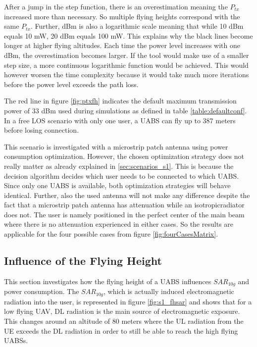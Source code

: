After a jump in the step function, there is an overestimation meaning the $P_{tx}$ increased more than necessary. So multiple flying heights correspond with the same $P_{tx}$.
Further, dBm is also a logarithmic scale meaning that while 10 dBm equals 10 mW, 20 dBm equals 100 mW. This explains why the black lines become longer at higher flying altitudes.
Each time the power level increases with one dBm, the overestimation becomes larger. If the tool would make use of a smaller step size, a more continuous 
logarithmic function would be achieved. This would however worsen the time complexity because it would take much more iterations before 
the power level exceeds the path loss. 

The red line in figure \ref{fig:ptxfh} indicates the default maximum transmission power of 33 dBm used during simulations as 
defined in table \ref{table:defaultconf}. 
In a free \gls{LOS} scenario with only one user, a \gls{UABS} can fly up to 387 meters before losing connection.

This scenario is investigated with a microstrip patch antenna using power consumption optimization. 
 However, the chosen optimization strategy does not really matter as already explained in  \ref{sec:scenarios_s1}. This is because the decision 
 algorithm decides which user 
needs to be connected to which \gls{UABS}. Since only one \gls{UABS} is available, both optimization strategies will behave identical.
Further, also the used antenna will not make any difference
despite the fact that a microstrip patch antenna has attenuation while an \gls{isotropicradiator} does not.
The user is namely positioned in the perfect center of the main beam where there is 
no attenuation experienced in either cases. So the results are applicable for the four possible cases from figure \ref{fig:fourCasesMatrix}.

\FloatBarrier
\subsection{Influence of the Flying Height}
\label{sub:senario1_influenceOfFlyHeight}

This section investigates how the flying height of a \gls{UABS} influences $SAR_{10g}$ and power consumption.
The $SAR_{10g}$, which is actually induced electromagnetic radiation into the user, is represented in figure \ref{fig:s1_fhsar}
and shows that for a low flying \gls{UAV}, \gls{DL} radiation is the main source of electromagnetic exposure.
This changes around an altitude of 80 meters where the \gls{UL} radiation from the \gls{UE}
exceeds the \gls{DL} radiation in order to still be able to reach the high flying \gls{UABS}s.

